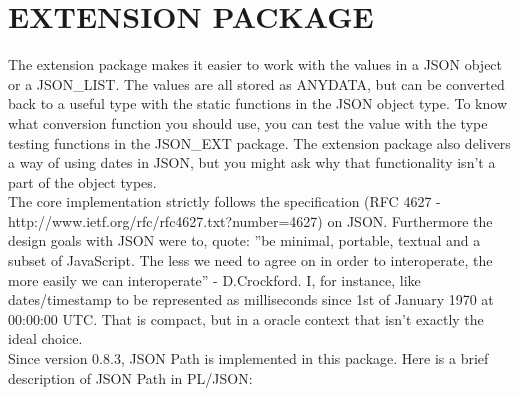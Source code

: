 \documentclass[11pt,twocolumn, a4paper]{article}
\begin{document}
\section*{EXTENSION PACKAGE}
The extension package makes it easier to work with the values in a JSON object or a JSON\_LIST. The values are all stored as ANYDATA, but can be converted back to a useful type with the static functions in the JSON object type. To know what conversion function you should use, you can test the value with the type testing functions in the JSON\_EXT package. The extension package also delivers a way of using dates in JSON, but you might ask why that functionality isn't a part of the object types. \\
The core implementation strictly follows the specification (RFC 4627 - http://www.ietf.org/rfc/rfc4627.txt?number=4627) on JSON. Furthermore the design goals with JSON were to, quote: ''be minimal, portable, textual and a subset of JavaScript. The less we need to agree on in order to interoperate, the more easily we can interoperate'' - D.Crockford. I, for instance, like dates/timestamp to be represented as milliseconds since 1st of January 1970 at 00:00:00 UTC. That is compact, but in a oracle context that isn't exactly the ideal choice. \\Since version 0.8.3, JSON Path is implemented in this package. Here is a brief description of JSON Path in PL/JSON:
\end{document}
